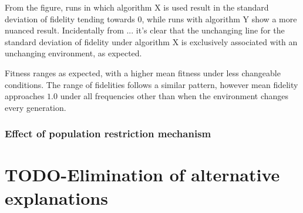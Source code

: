 From the figure, runs in which algorithm X is used result in the standard deviation of fidelity tending towards $0$, while runs with algorithm Y show a more nuanced result. Incidentally from ... it's clear that the unchanging line for the standard deviation of fidelity under algorithm X is exclusively associated with an unchanging environment, as expected.

Fitness ranges as expected, with a higher mean fitness under less changeable conditions. The range of fidelities follows a similar pattern, however mean fidelity approaches $1.0$ under all frequencies other than when the environment changes every generation. 

\subsection{Effect of population restriction mechanism}





\chapter{TODO-Elimination of alternative explanations}\label{elimination-of-alternative-explanations}

